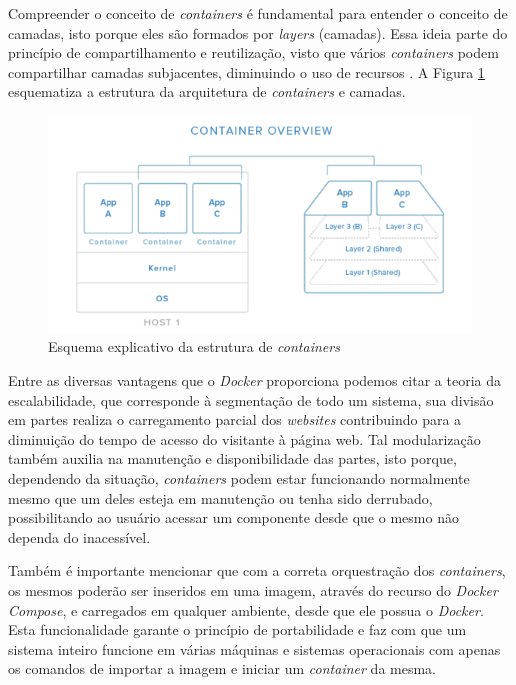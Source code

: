 Compreender o conceito de \textit{containers} é fundamental para entender o conceito de camadas, isto porque eles são formados por \textit{layers} (camadas). Essa ideia parte do princípio de compartilhamento e reutilização, visto que vários \textit{containers} podem compartilhar camadas subjacentes, diminuindo o uso de recursos \cite{prada4docker}. A Figura \ref{containers} esquematiza a estrutura da arquitetura de \textit{containers} e camadas.

\newpage

\begin{figure}[htb]
 \centering
 \caption{Esquema explicativo da estrutura de \textit{containers}}
 \includegraphics[scale=0.6]{figuras/containers}
 
 \label{containers}
\end{figure}

Entre as diversas vantagens que o \textit{Docker} proporciona podemos citar a teoria da escalabilidade, que corresponde à segmentação de todo um sistema, sua divisão em partes realiza o carregamento parcial dos \textit{websites} contribuindo para a diminuição do tempo de acesso do visitante à página web. Tal modularização também auxilia na manutenção e disponibilidade das partes, isto porque, dependendo da situação, \textit{containers} podem estar funcionando normalmente mesmo que um deles esteja em manutenção ou tenha sido derrubado, possibilitando ao usuário acessar um componente desde que o mesmo não dependa do inacessível. 

Também é importante mencionar que com a correta orquestração dos \textit{containers}, os mesmos poderão ser inseridos em uma imagem, através do recurso do \textit{Docker Compose}, e carregados em qualquer ambiente, desde que ele possua o \textit{Docker}. Esta funcionalidade garante o princípio de portabilidade e faz com que um sistema inteiro funcione em várias máquinas e sistemas operacionais com apenas os comandos de importar a imagem e iniciar um \textit{container} da mesma.

